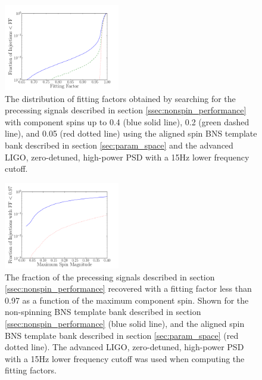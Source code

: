 \begin{figure}
\begin{center}
\includegraphics[width=0.45\textwidth]{papers/bns_spin/figure10.pdf}
\end{center}
\caption{\label{fig:anstar-prec} The distribution of fitting factors obtained by searching
for the precessing signals described in section \ref{ssec:nonspin_performance}
with component spins up to 0.4 (blue solid line), 0.2 (green dashed line), and 0.05 (red dotted line) using the aligned spin
BNS template bank described in section \ref{sec:param_space} and the advanced LIGO, zero-detuned,
high-power PSD with a 15Hz lower frequency cutoff.}
\end{figure}
\begin{figure}
\begin{center}
\includegraphics[width=0.45\textwidth]{papers/bns_spin/figure11.pdf}
\end{center}
\caption{\label{fig:anstar-st-spin} The fraction of the precessing signals described in
section \ref{ssec:nonspin_performance} recovered with a fitting factor less than 0.97 as
a function of the maximum component spin. Shown for the non-spinning
BNS template bank described in section \ref{ssec:nonspin_performance} (blue solid line),
and the aligned spin
BNS template bank described in section \ref{sec:param_space} (red dotted line). The advanced LIGO, zero-detuned,
high-power PSD with a 15Hz lower frequency cutoff was used when computing the fitting factors.}
\end{figure}

